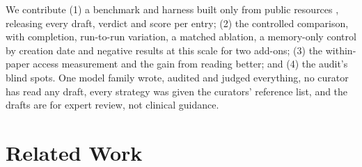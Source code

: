 \documentclass{article} %
\begin{document}
We contribute (1) a benchmark and harness built only from public resources \citep{sayers2026database,Louden2020MedgenNcbis,rosonovski2024europe,seal2023genenames}, releasing every draft, verdict and score per entry; (2) the controlled comparison, with completion, run-to-run variation, a matched ablation, a memory-only control by creation date and negative results at this scale for two add-ons; (3) the within-paper access measurement and the gain from reading better; and (4) the audit's blind spots. One model family wrote, audited and judged everything, no curator has read any draft, every strategy was given the curators' reference list, and the drafts are for expert review, not clinical guidance.

\section{Related Work}
\label{sec:related_work}
\end{document}
